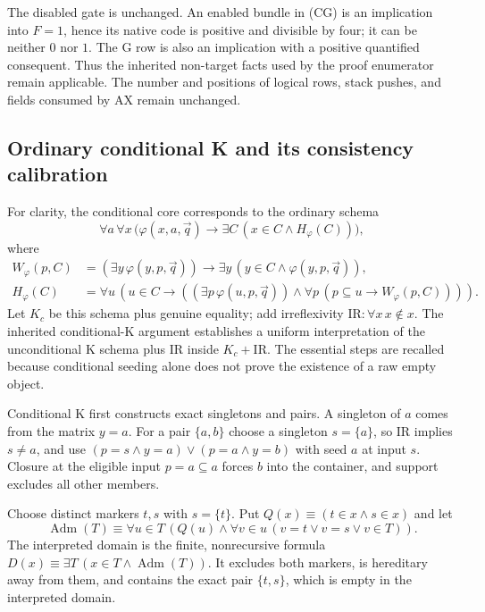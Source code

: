 The disabled gate is unchanged. An enabled bundle in (CG) is an implication
into $F=1$, hence its native code is positive and divisible by four; it can
be neither $0$ nor $1$. The G row is also an implication with a positive
quantified consequent. Thus the inherited non-target facts used by the
proof enumerator remain applicable. The number and positions of logical
rows, stack pushes, and fields consumed by AX remain unchanged.

\subsection{Ordinary conditional K and its consistency calibration}

For clarity, the conditional core corresponds to the ordinary schema
\[
 \forall a\,\forall x\,
   \bigl(\varphi(x,a,\vec q)\to
          \exists C\,(x\in C\wedge H_\varphi(C))\bigr),
\]
where
\begin{align*}
 W_\varphi(p,C)&=
   (\exists y\,\varphi(y,p,\vec q))\to
     \exists y\,(y\in C\wedge\varphi(y,p,\vec q)),\\
 H_\varphi(C)&=\forall u\,
 \left(u\in C\to
 \left((\exists p\,\varphi(u,p,\vec q))\wedge
       \forall p\,(p\subseteq u\to W_\varphi(p,C))\right)\right).
\end{align*}
Let $K_c$ be this schema plus genuine equality; add irreflexivity
$\mathrm{IR}:\forall x\,x\notin x$. The inherited conditional-K argument
establishes a uniform interpretation of the unconditional K schema plus IR
inside $K_c+\mathrm{IR}$. The essential steps are recalled because
conditional seeding alone does not prove the existence of a raw empty object.

Conditional K first constructs exact singletons and pairs. A singleton of
$a$ comes from the matrix $y=a$. For a pair $\{a,b\}$ choose a singleton
$s=\{a\}$, so IR implies $s\ne a$, and use
$(p=s\wedge y=a)\vee(p=a\wedge y=b)$ with seed $a$ at input $s$.
Closure at the eligible input $p=a\subseteq a$ forces $b$ into the
container, and support excludes all other members.

Choose distinct markers $t,s$ with $s=\{t\}$. Put
$Q(x)\equiv(t\in x\wedge s\in x)$ and let
\[
 \operatorname{Adm}(T)\equiv
 \forall u\in T\,
 \left(Q(u)\wedge\forall v\in u\,
       (v=t\vee v=s\vee v\in T)\right).
\]
The interpreted domain is the finite, nonrecursive formula
$D(x)\equiv\exists T\,(x\in T\wedge\operatorname{Adm}(T))$.
It excludes both markers, is hereditary away from them, and contains the
exact pair $\{t,s\}$, which is empty in the interpreted domain.

